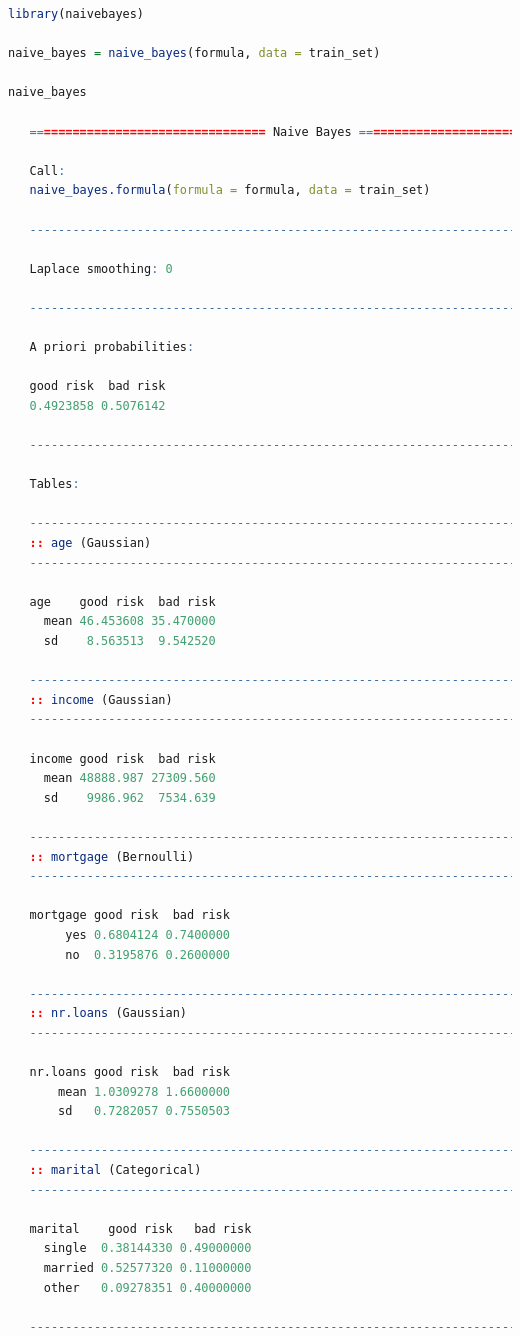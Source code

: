 \documentclass[
]{book}
\theoremstyle{definition}
\theoremstyle{definition}
\theoremstyle{definition}
\theoremstyle{definition}
\theoremstyle{remark}
\begin{document}
\begin{lstlisting}[language=R]
library(naivebayes)

naive_bayes = naive_bayes(formula, data = train_set)

naive_bayes
   
   ================================= Naive Bayes ==================================
   
   Call:
   naive_bayes.formula(formula = formula, data = train_set)
   
   -------------------------------------------------------------------------------- 
    
   Laplace smoothing: 0
   
   -------------------------------------------------------------------------------- 
    
   A priori probabilities: 
   
   good risk  bad risk 
   0.4923858 0.5076142 
   
   -------------------------------------------------------------------------------- 
    
   Tables: 
   
   -------------------------------------------------------------------------------- 
   :: age (Gaussian) 
   -------------------------------------------------------------------------------- 
         
   age    good risk  bad risk
     mean 46.453608 35.470000
     sd    8.563513  9.542520
   
   -------------------------------------------------------------------------------- 
   :: income (Gaussian) 
   -------------------------------------------------------------------------------- 
         
   income good risk  bad risk
     mean 48888.987 27309.560
     sd    9986.962  7534.639
   
   -------------------------------------------------------------------------------- 
   :: mortgage (Bernoulli) 
   -------------------------------------------------------------------------------- 
           
   mortgage good risk  bad risk
        yes 0.6804124 0.7400000
        no  0.3195876 0.2600000
   
   -------------------------------------------------------------------------------- 
   :: nr.loans (Gaussian) 
   -------------------------------------------------------------------------------- 
           
   nr.loans good risk  bad risk
       mean 1.0309278 1.6600000
       sd   0.7282057 0.7550503
   
   -------------------------------------------------------------------------------- 
   :: marital (Categorical) 
   -------------------------------------------------------------------------------- 
            
   marital    good risk   bad risk
     single  0.38144330 0.49000000
     married 0.52577320 0.11000000
     other   0.09278351 0.40000000
   
   --------------------------------------------------------------------------------
\end{lstlisting}
\end{document}
